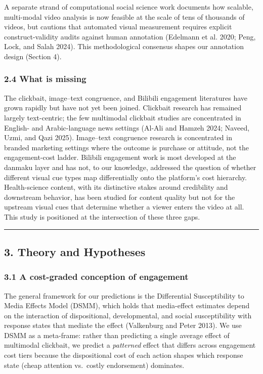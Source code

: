 \documentclass[
  12pt,
]{article}
\begin{document}
A separate strand of computational social science work documents how
scalable, multi-modal video analysis is now feasible at the scale of
tens of thousands of videos, but cautions that automated visual
measurement requires explicit construct-validity audits against human
annotation (Edelmann et al. 2020; Peng, Lock, and Salah 2024). This
methodological consensus shapes our annotation design (Section 4).

\subsubsection{2.4 What is missing}\label{what-is-missing}

The clickbait, image--text congruence, and Bilibili engagement
literatures have grown rapidly but have not yet been joined. Clickbait
research has remained largely text-centric; the few multimodal clickbait
studies are concentrated in English- and Arabic-language news settings
(Al-Ali and Hamzeh 2024; Naveed, Uzmi, and Qazi 2025). Image--text
congruence research is concentrated in branded marketing settings where
the outcome is purchase or attitude, not the engagement-cost ladder.
Bilibili engagement work is most developed at the danmaku layer and has
not, to our knowledge, addressed the question of whether different
visual cue types map differentially onto the platform's cost hierarchy.
Health-science content, with its distinctive stakes around credibility
and downstream behavior, has been studied for content quality but not
for the upstream visual cues that determine whether a viewer enters the
video at all. This study is positioned at the intersection of these
three gaps.

\begin{center}\rule{0.5\linewidth}{0.5pt}\end{center}

\subsection{3. Theory and Hypotheses}\label{theory-and-hypotheses}

\subsubsection{3.1 A cost-graded conception of
engagement}\label{a-cost-graded-conception-of-engagement}

The general framework for our predictions is the Differential
Susceptibility to Media Effects Model (DSMM), which holds that
media-effect estimates depend on the interaction of dispositional,
developmental, and social susceptibility with response states that
mediate the effect (Valkenburg and Peter 2013). We use DSMM as a
meta-frame: rather than predicting a single average effect of multimodal
clickbait, we predict a \emph{patterned} effect that differs across
engagement cost tiers because the dispositional cost of each action
shapes which response state (cheap attention vs.~costly endorsement)
dominates.
\end{document}
